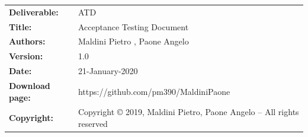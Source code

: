 \begin{table}[h!]
\begin{tabu} to \textwidth { X[0.3,r,p] X[0.7,l,p] }
\hline

\textbf{Deliverable:} & ATD\\
\textbf{Title:} & Acceptance Testing Document\\
\textbf{Authors:} & Maldini Pietro , Paone Angelo \\
\textbf{Version:} & 1.0 \\ 
\textbf{Date:} & 21-January-2020 \\
\textbf{Download page:} & https://github.com/pm390/MaldiniPaone\\
\textbf{Copyright:} & Copyright © 2019, Maldini Pietro, Paone Angelo – All rights reserved \\
\hline
\end{tabu}
\end{table}




\setcounter{page}{2}


\newpage
{}
\tableofcontents


\clearpage
{}
\label{sect:introduction}


\clearpage
{}
\label{sect:Project analyzed}



\clearpage
{}
\label{sect:Setup}



